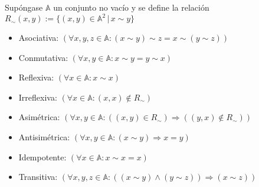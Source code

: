 \documentclass{article}
\begin{document}
Supóngase $\mathbb{A}$ un conjunto no vacío y se define la relación $R_{\sim}(x, y) := \{(x, y) \in \mathbb{A}^2 \, \vert\, x \sim y\}$
\begin{itemize}
    \item Asociativa:
    $(\forall x, y, z \in \mathbb{A} : (x \sim y) \sim z = x \sim (y \sim z))$
    \item Conmutativa:
    $(\forall x, y \in \mathbb{A} : x \sim y = y \sim x)$
    \item Reflexiva:
    $(\forall x \in \mathbb{A} : x \sim x)$
    \item Irreflexiva:
    $(\forall x \in \mathbb{A} : (x, x) \notin R_{\sim})$
    \item Asimétrica:
    $(\forall x, y \in \mathbb{A} : ((x, y) \in R_{\sim}) \Rightarrow ((y, x) \notin R_{\sim}))$
    \item Antisimétrica:
    $(\forall x, y \in \mathbb{A} : (x \sim y) \Rightarrow x = y)$
    \item Idempotente:
    $(\forall x \in \mathbb{A} : x \sim x = x)$
    \item Transitiva:
    $(\forall x, y, z \in \mathbb{A} : ((x \sim y) \wedge (y \sim z)) \Rightarrow (x \sim z))$
\end{itemize}
\end{document}
